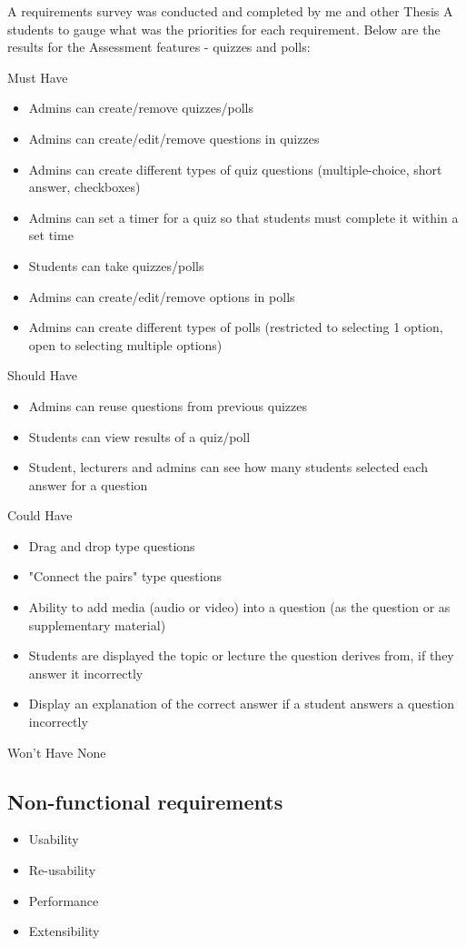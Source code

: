 A requirements survey was conducted and completed by me and other Thesis A students to gauge what was the priorities for each requirement. Below are the results for the Assessment features - quizzes and polls:

Must Have
\begin{itemize}
	\item Admins can create/remove quizzes/polls
	\item Admins can create/edit/remove questions in quizzes
	\item Admins can create different types of quiz questions (multiple-choice, short answer, checkboxes)
	\item Admins can set a timer for a quiz so that students must complete it within a set time
	\item Students can take quizzes/polls
	\item Admins can create/edit/remove options in polls
	\item Admins can create different types of polls (restricted to selecting 1 option, open to selecting multiple options)
\end{itemize}

Should Have
\begin{itemize}
	\item Admins can reuse questions from previous quizzes
	\item Students can view results of a quiz/poll
	\item Student, lecturers and admins can see how many students selected each answer for a question
\end{itemize}

Could Have
\begin{itemize}
	\item Drag and drop type questions
	\item "Connect the pairs" type questions
	\item Ability to add media (audio or video) into a question (as the question or as supplementary material)
	\item Students are displayed the topic or lecture the question derives from, if they answer it incorrectly
	\item Display an explanation of the correct answer if a student answers a question incorrectly
\end{itemize}

Won't Have
None

\subsection{Non-functional requirements}
\begin{itemize}
	\item Usability
	\item Re-usability
	\item Performance
	\item Extensibility
\end{itemize}



